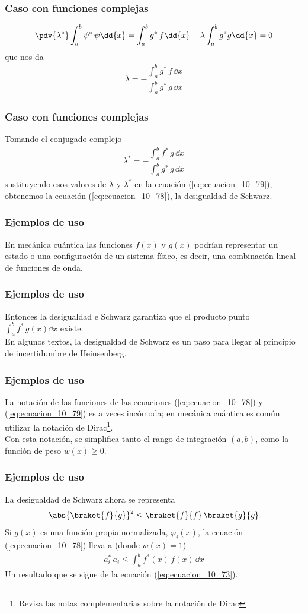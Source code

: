\begin{frame}
\frametitle{Caso con funciones complejas}
\begin{align*}
\pdv{\lambda^{*}} \int_{a}^{b} \psi^{*} \, \psi \dd{x} = \int_{a}^{b} g^{*} \, f \dd{x}  + \lambda \int_{a}^{b} g^{*} g \dd{x} = 0
\end{align*}
\pause
que nos da
\begin{align}
\lambda = - \dfrac{\displaystyle \int_{a}^{b} g^{*} \, f \, \dd{x}}{\displaystyle \int_{a}^{b} g^{*} \, g \, \dd{x}}
\label{eq:ecuacion_10_80a}
\end{align}
\end{frame}
\begin{frame}
\frametitle{Caso con funciones complejas}
Tomando el conjugado complejo 
\begin{align}
\lambda^{*} = - \dfrac{\displaystyle \int_{a}^{b} f^{*} \, g \, \dd{x}}{\displaystyle \int_{a}^{b} g^{*} \, g \, \dd{x}}
\label{eq:ecuacion_80b}
\end{align}
\pause
sustituyendo esos valores de $\lambda$ y $\lambda^{*}$ en la ecuación (\ref{eq:ecuacion_10_79}), obtenemos la ecuación (\ref{eq:ecuacion_10_78}), \underline{la desigualdad de Schwarz}.
\end{frame}
\begin{frame}
\frametitle{Ejemplos de uso}
En mecánica cuántica las funciones $f(x)$ y $g(x)$ podrían representar un estado o una configuración de un sistema físico, es decir, una combinación lineal de funciones de onda.
\end{frame}
\begin{frame}
\frametitle{Ejemplos de uso}
Entonces la desigualdad e Schwarz garantiza que el producto punto $\displaystyle \int_{a}^{b} f^{*} \, g(x) \dd{x}$ existe. 
\\
\bigskip
En algunos textos, la desigualdad de Schwarz es un paso para llegar al principio de incertidumbre de Heinsenberg.
\end{frame}
\begin{frame}
\frametitle{Ejemplos de uso}
La notación de las funciones de las ecuaciones (\ref{eq:ecuacion_10_78}) y (\ref{eq:ecuacion_10_79}) es a veces incómoda; en mecánica cuántica es común utilizar la notación de Dirac\footnote{Revisa las notas complementarias sobre la notación de Dirac}.
\\
\bigskip
Con esta notación, se simplifica tanto el rango de integración $(a, b)$, como la función de peso $w(x) \geq 0$.
\end{frame}
\begin{frame}
\frametitle{Ejemplos de uso}
La desigualdad de Schwarz ahora se representa
\begin{align}
\abs{\braket{f}{g}}^{2} \leq \braket{f}{f} \, \braket{g}{g}
\label{eq:ecuacion_10_78a}
\end{align}
\pause
Si $g(x)$ es una función propia normalizada, $\varphi_{i}(x)$, la ecuación (\ref{eq:ecuacion_10_78}) lleva a (donde $w(x)=1$)
\begin{align}
a_{i}^{*} \, a_{i} \leq \int_{a}^{b} f^{*}(x) \, f(x) \, \dd{x} 
\label{eq:ecuacion_10_81}
\end{align}
Un resultado que se sigue de la ecuación (\ref{eq:ecuacion_10_73}).
\end{frame}
